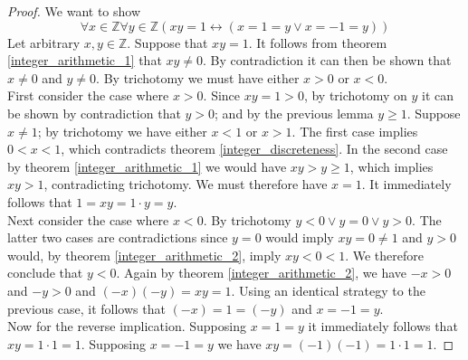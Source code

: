 \documentclass{report}
\begin{document}
\begin{proof}
We want to show 
\begin{equation*}
\forall x\in\mathbb Z\forall y\in\mathbb Z(xy=1\leftrightarrow(x=1=y\lor x=-1=y))
\end{equation*}
Let arbitrary $x,y\in\mathbb Z$. Suppose that $xy=1$. It follows from theorem \ref{integer_arithmetic_1} that $xy\neq0$. By contradiction it can then be shown that $x\neq0$ and $y\neq0$.
By trichotomy we must have either $x>0$ or $x<0$. \\
\indent First consider the case where $x>0$. Since $xy=1>0$, by trichotomy on $y$ it can be shown by contradiction that $y>0$; and by the previous lemma $y\geq1$. 
Suppose $x\neq1$; by trichotomy we have either $x<1$ or $x>1$.
The first case implies $0<x<1$, which contradicts theorem \ref{integer_discreteness}. In the second case by theorem \ref{integer_arithmetic_1} we would have
$xy>y\geq1$, which implies $xy>1$, contradicting trichotomy. We must therefore have $x=1$. It immediately follows that $1=xy=1\cdot y=y$.\\
\indent Next consider the case where $x<0$. By trichotomy $y<0\lor y=0\lor y>0$. The latter two cases are contradictions since $y=0$ would imply $xy=0\neq1$ and $y>0$ would, 
by theorem \ref{integer_arithmetic_2}, imply $xy<0<1$. We therefore conclude that $y<0$.
Again by theorem \ref{integer_arithmetic_2}, we have $-x>0$ and $-y>0$ and $(-x)(-y)=xy=1$.
Using an identical strategy to the previous case, it follows that $(-x)=1=(-y)$ and $x=-1=y$.\\
\indent Now for the reverse implication. Supposing $x=1=y$ it immediately follows that $xy=1\cdot1=1$.
Supposing $x=-1=y$ we have $xy=(-1)(-1)=1\cdot1=1$.
\end{proof}
\newpage
\end{document}
